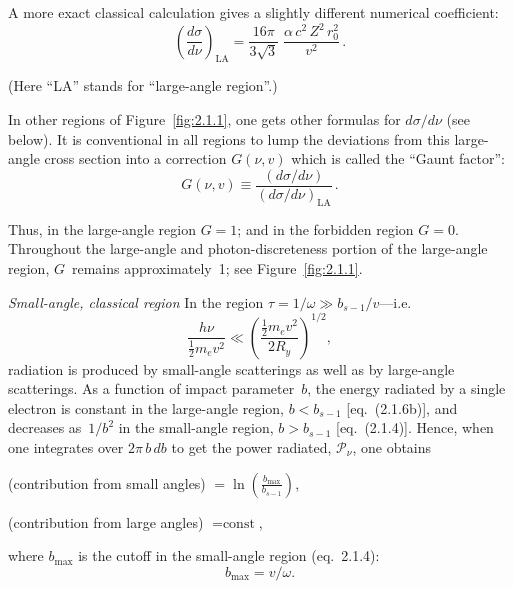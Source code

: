 A more exact classical calculation gives a slightly different numerical
coefficient:
\begin{equation}
  \left(\frac{d\sigma}{d\nu}\right)_{\!\text{LA}}
  = \frac{16\pi}{3\sqrt{3}}\;
    \frac{\alpha\,c^{2}\,Z^{2}\,r_0^{2}}{v^{2}}\,.
  \tag{2.1.12}
\end{equation}

\noindent(Here ``LA'' stands for ``large-angle region''.)

In other regions of Figure~\ref{fig:2.1.1}, one gets other formulas for
$d\sigma/d\nu$ (see below).  It is conventional in all regions to lump
the deviations from this large-angle cross section into a correction
$G(\nu,v)$ which is called the ``Gaunt factor'':
\begin{equation}
  G(\nu,v)
  \equiv \frac{(d\sigma/d\nu)}{(d\sigma/d\nu)_{\text{LA}}}\,.
  \tag{2.1.13}
\end{equation}

Thus, in the large-angle region $G = 1$; and in the forbidden region
$G = 0$.  Throughout the large-angle and photon-discreteness portion of
the large-angle region, $G$~remains approximately~1; see
Figure~\ref{fig:2.1.1}.


\bigskip
\noindent\textit{Small-angle, classical region}\quad
In the region $\tau = 1/\omega \gg b_{s-1}/v$---i.e.
\begin{equation}
  \frac{h\nu}{\tfrac{1}{2}m_e v^{2}}
  \ll \left(\frac{\tfrac{1}{2}m_e v^{2}}{2R_y}\right)^{\!1/2},
  \tag{2.1.14}
\end{equation}
radiation is produced by small-angle scatterings as well as by
large-angle scatterings.  As a function of impact parameter~$b$, the
energy radiated by a single electron is constant in the large-angle
region, $b < b_{s-1}$ [eq.~(2.1.6b)], and decreases as~$1/b^{2}$ in
the small-angle region, $b > b_{s-1}$ [eq.~(2.1.4)].  Hence, when one
integrates over $2\pi\,b\,db$ to get the power radiated,
$\mathscr{P}_\nu$, one obtains

\smallskip
\noindent(contribution from small angles)
$\displaystyle{}= \ln\!\left(\frac{b_{\max}}{b_{s-1}}\right)$,

\smallskip
\noindent(contribution from large angles) ${}= \text{const}$,

\smallskip
\noindent where $b_{\max}$ is the cutoff in the small-angle region
(eq.~2.1.4):
\begin{equation}
  b_{\max} = v/\omega.
  \tag{2.1.15}
\end{equation}

